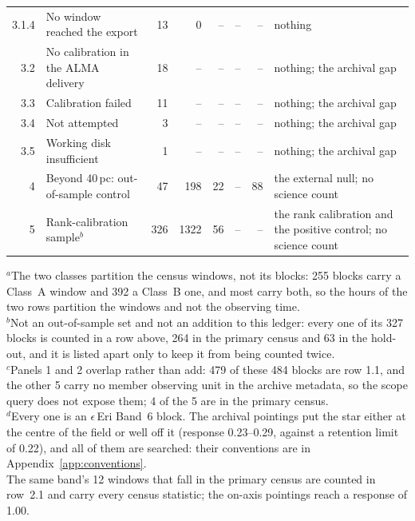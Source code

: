 \begin{tabular}{@{}r@{~}p{}rrrrrp{}@{}}
3.1.4 & \hspace{1.6em}No window reached the export & 13 & 0 & -- & -- & -- & nothing \\
3.2 & \hspace{0.8em}No calibration in the ALMA delivery & 18 & -- & -- & -- & -- & nothing; the archival gap \\
3.3 & \hspace{0.8em}Calibration failed & 11 & -- & -- & -- & -- & nothing; the archival gap \\
3.4 & \hspace{0.8em}Not attempted & 3 & -- & -- & -- & -- & nothing; the archival gap \\
3.5 & \hspace{0.8em}Working disk insufficient & 1 & -- & -- & -- & -- & nothing; the archival gap \\
\hline
4 & Beyond 40\,pc: out-of-sample control & 47 & 198 & 22 & -- & 88 & the external null; no science count \\
5 & Rank-calibration sample$^{b}$ & 326 & 1322 & 56 & -- & -- & the rank calibration and the positive control; no science count \\
\hline
\end{tabular}

{\footnotesize\raggedright $^{a}$The two classes partition the census windows, not its blocks: 255 blocks carry a Class~A window and 392 a Class~B one, and most carry both, so the hours of the two rows partition the windows and not the observing time.\\ $^{b}$Not an out-of-sample set and not an addition to this ledger: every one of its 327 blocks is counted in a row above, 264 in the primary census and 63 in the hold-out, and it is listed apart only to keep it from being counted twice.\\ $^{c}$Panels 1 and 2 overlap rather than add: 479 of these 484 blocks are row 1.1, and the other 5 carry no member observing unit in the archive metadata, so the scope query does not expose them; 4 of the 5 are in the primary census.\\ $^{d}$Every one is an $\epsilon$\,Eri Band~6 block. The archival pointings put the star either at the centre of the field or well off it (response 0.23--0.29, against a retention limit of 0.22), and all of them are searched: their conventions are in Appendix~\ref{app:conventions}.\\ The same band's 12 windows that fall in the primary census are counted in row~2.1 and carry every census statistic; the on-axis pointings reach a response of 1.00.}
